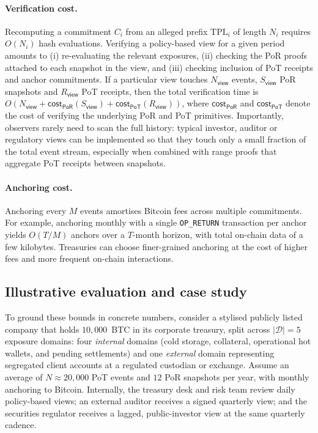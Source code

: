 \documentclass[11pt]{article}
\begin{document}
\paragraph{Verification cost.}
Recomputing a commitment $C_i$ from an alleged prefix $\mathrm{TPL}_i$ of length $N_i$ requires $O(N_i)$ hash evaluations.
Verifying a policy-based view for a given period amounts to (i) re-evaluating the relevant exposures, (ii) checking the PoR proofs attached to each snapshot in the view, and (iii) checking inclusion of PoT receipts and anchor commitments.
If a particular view touches $N_{\mathsf{view}}$ events, $S_{\mathsf{view}}$ PoR snapshots and $R_{\mathsf{view}}$ PoT receipts, then the total verification time is
$O\!\left(N_{\mathsf{view}} + \mathsf{cost}_{\mathsf{PoR}}(S_{\mathsf{view}}) + \mathsf{cost}_{\mathsf{PoT}}(R_{\mathsf{view}})\right)$,
where $\mathsf{cost}_{\mathsf{PoR}}$ and $\mathsf{cost}_{\mathsf{PoT}}$ denote the cost of verifying the underlying PoR and PoT primitives.
Importantly, observers rarely need to scan the full history: typical investor, auditor or regulatory views can be implemented so that they touch only a small fraction of the total event stream, especially when combined with range proofs that aggregate PoT receipts between snapshots.

\paragraph{Anchoring cost.}
Anchoring every $M$ events amortises Bitcoin fees across multiple commitments.
For example, anchoring monthly with a single \texttt{OP\_RETURN} transaction per anchor yields $O(T/M)$ anchors over a $T$-month horizon, with total on-chain data of a few kilobytes.
Treasuries can choose finer-grained anchoring at the cost of higher fees and more frequent on-chain interactions.

\subsection{Illustrative evaluation and case study}

To ground these bounds in concrete numbers, consider a stylised publicly listed company that holds
$10{,}000$~BTC in its corporate treasury, split across $|\mathcal{D}|=5$ exposure domains:
four \emph{internal} domains (cold storage, collateral, operational hot wallets, and pending settlements) and
one \emph{external} domain representing segregated client accounts at a regulated custodian or exchange.
Assume an average of $N \approx 20{,}000$ PoT events and $12$ PoR snapshots per year, with monthly anchoring to Bitcoin.
Internally, the treasury desk and risk team review daily policy-based views;
an external auditor receives a signed quarterly view; and the securities regulator receives
a lagged, public-investor view at the same quarterly cadence.
\end{document}
